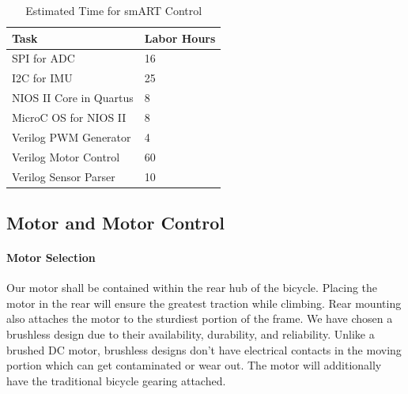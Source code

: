 \documentclass[12pt,article]{IEEEtran}
\begin{document}
        \begin{table}[H]        
            \renewcommand{\arraystretch}{1.3}
                    \caption{Estimated Time for smART Control}
                    
                    \label{Estimated Time}
                    
                    \centering
                    \begin{tabular}{p{5.5cm}|p{2cm}}
                    \hline
                    \bfseries   Task                        & \bfseries Labor Hours                         \\
                    \hline\hline
                                SPI for ADC                 & 16                                            \\
                                I2C for IMU                 & 25                                            \\  
                                NIOS II Core in Quartus     & 8                                             \\  
                                MicroC OS for NIOS II       & 8                                            \\
                                Verilog PWM Generator       & 4                                             \\
                                Verilog Motor Control       & 60                                            \\  
                                Verilog Sensor Parser       & 10                                            \\  
                                \hline
                    \end{tabular}
            \end{table}

    \subsection{\bfseries Motor and Motor Control}
        \paragraph{\bfseries Motor Selection}
            Our motor shall be contained within the rear hub of the bicycle. Placing the motor in the rear 
            will ensure the greatest traction while climbing. Rear mounting also attaches the motor to the 
            sturdiest portion of the frame. We have chosen a brushless design due to their availability, 
            durability, and reliability. Unlike a brushed DC motor, brushless designs don’t have electrical 
            contacts in the moving portion which can get contaminated or wear out. The motor will additionally 
            have the traditional bicycle gearing attached. 
\end{document}
